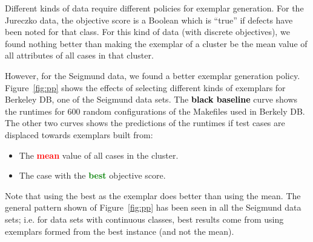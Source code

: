 \documentclass[conference]{IEEEtran}
\newcommand{\bi}{\begin{itemize}}
\newcommand{\ei}{\end{itemize}}
\newcommand{\fig}[1]{Figure~\ref{fig:#1}}
\begin{document}
Different kinds of data require
different policies for exemplar generation.
For the Jureczko data, the objective score
is a Boolean which is  ``true'' if defects have been noted
for that class.  For this kind of data (with discrete objectives),
we found nothing better than  making the exemplar of a cluster be the mean
value of all attributes of all cases in that cluster.

However, for the Seigmund data, we found a better exemplar generation policy.
\fig{pp} shows the effects of selecting different kinds of exemplars for 
Berkeley DB, one of the Seigmund data sets.
The \textcolor{black}{\bf black baseline} curve  shows the runtimes for 600 random configurations
of the Makefiles used in Berkely DB. The other two curves shows the predictions of the runtimes if test cases are displaced towards exemplars
  built from:
\bi
\item The \textcolor{red}{\bf   mean}    value of all cases in the  cluster.
\item The  case with the \textcolor{green}{\bf  best}  objective score. 
\ei
Note that using the best as the exemplar does better than using the mean.
The general pattern shown of \fig{pp} has been seen in all the Seigmund data sets;
i.e. for data sets with continuous classes,
best results come from using exemplars formed from the best instance (and not the mean). 

  
  
\end{document}
